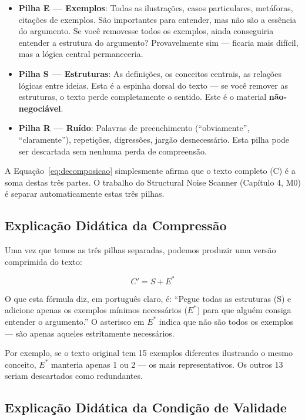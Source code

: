 \begin{itemize}
    \item \textbf{Pilha E — Exemplos}: Todas as ilustrações, casos particulares, metáforas, citações de exemplos. São importantes para entender, mas não são a essência do argumento. Se você removesse todos os exemplos, ainda conseguiria entender a estrutura do argumento? Provavelmente sim — ficaria mais difícil, mas a lógica central permaneceria.
    
    \item \textbf{Pilha S — Estruturas}: As definições, os conceitos centrais, as relações lógicas entre ideias. Esta é a espinha dorsal do texto — se você remover as estruturas, o texto perde completamente o sentido. Este é o material \textbf{não-negociável}.
    
    \item \textbf{Pilha R — Ruído}: Palavras de preenchimento (``obviamente'', ``claramente''), repetições, digressões, jargão desnecessário. Esta pilha pode ser descartada sem nenhuma perda de compreensão.
\end{itemize}

A Equação~\ref{eq:decomposicao} simplesmente afirma que o texto completo (C) é a soma destas três partes. O trabalho do Structural Noise Scanner (Capítulo 4, M0) é separar automaticamente estas três pilhas.

\subsection{Explicação Didática da Compressão}

Uma vez que temos as três pilhas separadas, podemos produzir uma versão comprimida do texto:

\begin{equation}
C' = S + E^*
\label{eq:reduzido}
\end{equation}

O que esta fórmula diz, em português claro, é: ``Pegue todas as estruturas (S) e adicione apenas os exemplos mínimos necessários ($E^*$) para que alguém consiga entender o argumento.'' O asterisco em $E^*$ indica que não são todos os exemplos — são apenas aqueles estritamente necessários.

Por exemplo, se o texto original tem 15 exemplos diferentes ilustrando o mesmo conceito, $E^*$ manteria apenas 1 ou 2 — os mais representativos. Os outros 13 seriam descartados como redundantes.

\subsection{Explicação Didática da Condição de Validade}

